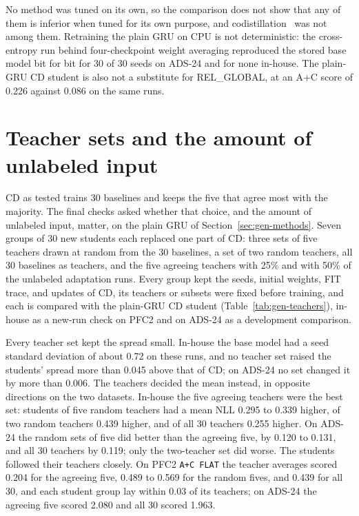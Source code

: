 No method was tuned on its own, so the comparison does not show that
any of them is inferior when tuned for its own purpose, and
codistillation~\cite{anil2018large} was not among them. Retraining the
plain GRU on CPU is not deterministic: the cross-entropy run behind
four-checkpoint weight averaging reproduced the stored base model bit
for bit for 30 of 30 seeds on ADS-24 and for none in-house. The
plain-GRU CD student is also not a substitute for REL\_GLOBAL, at an
A+C score of 0.226 against 0.086 on the same runs.


\section{Teacher sets and the amount of unlabeled input}
\label{sec:gen-teachers}

CD as tested trains 30 baselines and keeps the five that agree most
with the majority. The final checks asked whether that choice, and the
amount of unlabeled input, matter, on the plain GRU of
Section~\ref{sec:gen-methods}. Seven groups of 30 new students each
replaced one part of CD: three sets of five teachers drawn at random
from the 30 baselines, a set of two random teachers, all 30 baselines as
teachers, and the five agreeing teachers with 25\% and with 50\% of the
unlabeled adaptation runs. Every group kept the seeds, initial weights, FIT trace, and updates of
CD, its teachers or subsets were fixed before training, and each is
compared with the plain-GRU CD student (Table~\ref{tab:gen-teachers}),
in-house as a new-run check on PFC2 and on ADS-24 as a development
comparison.

Every teacher set kept the spread small. In-house the base model had a
seed standard deviation of about 0.72 on these runs, and no teacher set
raised the students' spread more than 0.045 above that of CD; on ADS-24
no set changed it by more than 0.006. The teachers decided the mean
instead, in opposite directions on the two datasets. In-house the five
agreeing teachers were the best set: students of five random teachers
had a mean NLL 0.295 to 0.339 higher, of two random teachers 0.439
higher, and of all 30 teachers 0.255 higher. On ADS-24 the random sets
of five did better than the agreeing five, by 0.120 to 0.131, and all 30
teachers by 0.119; only the two-teacher set did worse. The students
followed their teachers closely. On PFC2 \texttt{A+C FLAT} the teacher
averages scored 0.204 for the agreeing five, 0.489 to 0.569 for the
random fives, and 0.439 for all 30, and each student group lay within
0.03 of its teachers; on ADS-24 the agreeing five scored 2.080 and all 30
scored 1.963.

